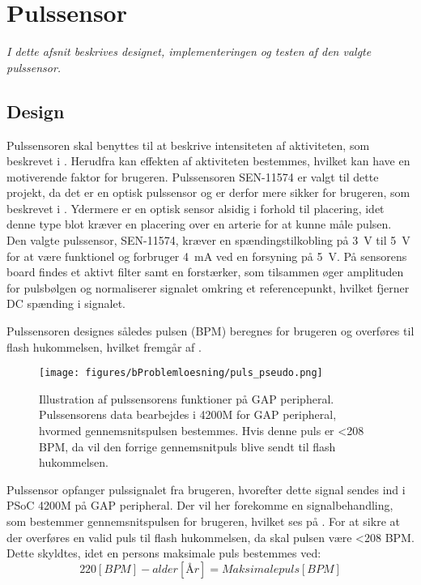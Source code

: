 \section{Pulssensor}\label{sec_de_im_te_puls}
\textit{I dette afsnit beskrives designet, implementeringen og testen af den valgte pulssensor.}

\subsection{Design} \label{sec_design_puls}
Pulssensoren skal benyttes til at beskrive intensiteten af aktiviteten, som beskrevet i . Herudfra kan effekten af aktiviteten bestemmes, hvilket kan have en motiverende faktor for brugeren. \newline
Pulssensoren SEN-11574 er valgt til dette projekt, da det er en optisk pulssensor og er derfor mere sikker for brugeren, som beskrevet i . Ydermere er en optisk sensor alsidig i forhold til placering, idet denne type blot kræver en placering over en arterie for at kunne måle pulsen. \newline
Den valgte pulssensor, SEN-11574, kræver en spændingstilkobling på 3~V til 5~V for at være funktionel og forbruger 4~mA ved en forsyning på 5~V. På sensorens board findes et aktivt filter samt en forstærker, som tilsammen øger amplituden for pulsbølgen og normaliserer signalet omkring et referencepunkt, hvilket fjerner DC spænding i signalet. \citep{Murphy2016,Murphy2016_sensor}

Pulssensoren designes således pulsen (BPM) beregnes for brugeren og overføres til flash hukommelsen, hvilket fremgår af .

\begin{figure}[H]
	\centering
	\texttt{[image: figures/bProblemloesning/puls\_pseudo.png]}
	\caption{Illustration af pulssensorens funktioner på GAP peripheral. Pulssensorens data bearbejdes i 4200M for GAP peripheral, hvormed gennemsnitspulsen bestemmes. Hvis denne puls er <208 BPM, da vil den forrige gennemsnitpuls blive sendt til flash hukommelsen.}
	\label{fig:puls_pseudo}
\end{figure}

Pulssensor opfanger pulssignalet fra brugeren, hvorefter dette signal sendes ind i PSoC 4200M på GAP peripheral. Der vil her forekomme en signalbehandling, som bestemmer gennemsnitspulsen for brugeren, hvilket ses på . For at sikre at der overføres en valid puls til flash hukommelsen, da skal pulsen være <208 BPM. Dette skyldtes, idet en persons maksimale puls bestemmes ved: \citep{CooperBlair2005} 
\begin{equation}
220 [BPM] - alder [År] = Maksimale puls [BPM]
\end{equation}

